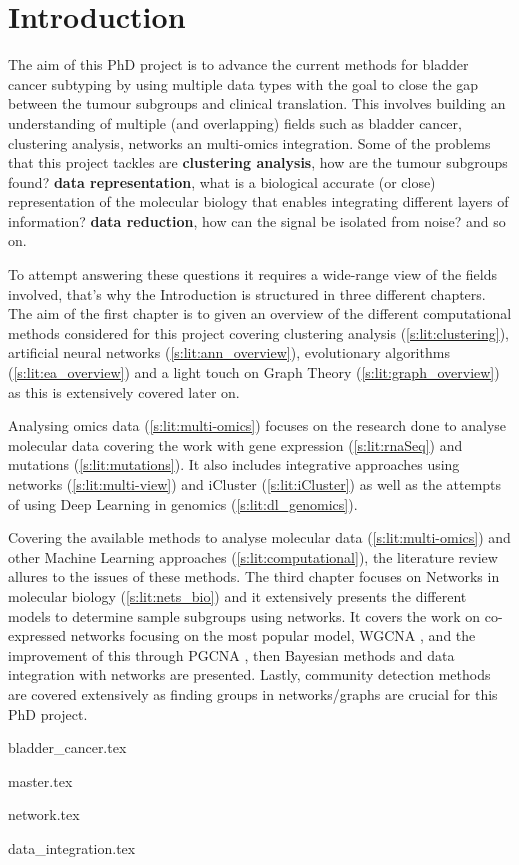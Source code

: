 

\section{Introduction}


The aim of this PhD project is to advance the current methods for bladder cancer subtyping by using multiple data types with the goal to close the gap between the tumour subgroups and clinical translation. This involves building an understanding of multiple (and overlapping) fields such as bladder cancer, clustering analysis, networks an multi-omics integration. Some of the problems that this project tackles are \textbf{clustering analysis}, how are the tumour subgroups found? \textbf{data representation}, what is a biological accurate (or close) representation of the molecular biology that enables integrating different layers of information? \textbf{data reduction}, how can the signal be isolated from noise? and so on.

To attempt answering these questions it requires a wide-range view of the fields involved, that's why the Introduction is structured in three different chapters. The aim of the first chapter is to given an overview of the different computational methods considered for this project covering clustering analysis (\ref{s:lit:clustering}), artificial neural networks (\ref{s:lit:ann_overview}), evolutionary algorithms (\ref{s:lit:ea_overview}) and a light touch on Graph Theory (\ref{s:lit:graph_overview}) as this is extensively covered later on.

Analysing omics data (\ref{s:lit:multi-omics}) focuses on the research done to analyse molecular data covering the work with gene expression (\ref{s:lit:rnaSeq}) and mutations (\ref{s:lit:mutations}). It also includes integrative approaches using networks (\ref{s:lit:multi-view}) and iCluster (\ref{s:lit:iCluster}) as well as the attempts of using Deep Learning in genomics (\ref{s:lit:dl_genomics}). 

Covering the available methods to analyse molecular data (\ref{s:lit:multi-omics}) and other Machine Learning approaches (\ref{s:lit:computational}), the literature review allures to the issues of these methods. The third chapter focuses on Networks in molecular biology (\ref{s:lit:nets_bio}) and it extensively presents the different models to determine sample subgroups using networks. It covers the work on co-expressed networks focusing on the most popular model, WGCNA \cite{Langfelder2008-sn}, and the improvement of this through PGCNA \cite{Care2019-ij}, then Bayesian methods and data integration with networks are presented. Lastly, community detection methods are covered extensively as finding groups in networks/graphs are crucial for this PhD project.

{bladder_cancer.tex}

\pagebreak

{master.tex}

{network.tex}

{data_integration.tex}


